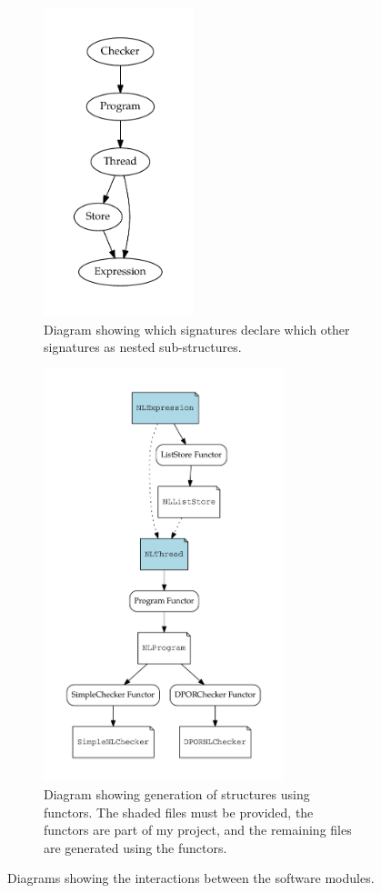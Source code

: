 \documentclass[12pt,a4paper,twoside,openright]{report}
\begin{document}
\begin{figure}
	\centering
	\begin{subfigure}{.43\textwidth}
		\centering
		\includegraphics[height=9cm]{interfaces}
		\caption{Diagram showing which signatures declare
			which other signatures as nested sub-structures.}
		\label{fig:interfaces}
	\end{subfigure}%
	\qquad
	\begin{subfigure}{.43\textwidth}
		\centering
		\includegraphics[height=12cm]{functors}
		\caption{Diagram showing generation of
			structures using functors.
			The shaded files must be provided,
			the functors are part of my project,
			and the remaining files
			are generated using the functors.}
		\label{fig:functors}
	\end{subfigure}
	\caption{Diagrams showing the interactions between
		the software modules.}
	\label{fig:design}
\end{figure}
\end{document}
